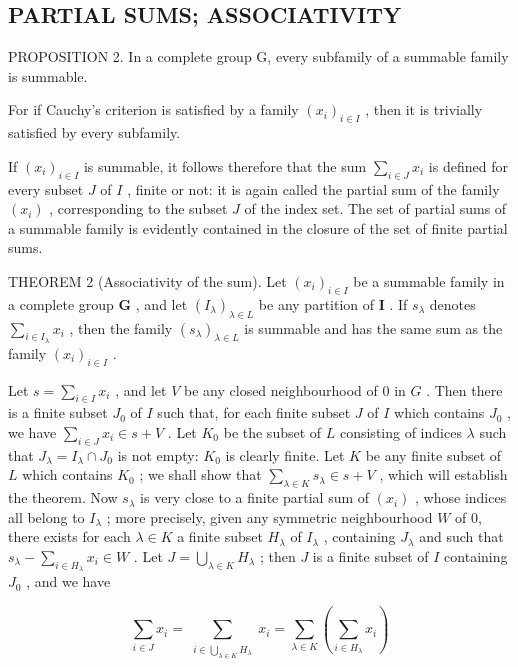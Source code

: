 \subsection{PARTIAL SUMS; ASSOCIATIVITY}

PROPOSITION 2. In a complete group G, every subfamily of a summable family is summable.

For if Cauchy's criterion is satisfied by a family \((x_{i})_{i\in I}\) , then it is trivially satisfied by every subfamily.

If \((x_{i})_{i\in I}\) is summable, it follows therefore that the sum \(\sum_{i\in J}x_{i}\) is defined for every subset \(J\) of \(I\) , finite or not: it is again called the partial sum of the family \((x_{i})\) , corresponding to the subset \(J\) of the index set. The set of partial sums of a summable family is evidently contained in the closure of the set of finite partial sums.

THEOREM 2 (Associativity of the sum). Let \((x_{i})_{i\in I}\) be a summable family in a complete group \(\mathbf{G}\) , and let \((I_{\lambda})_{\lambda \in L}\) be any partition of \(\mathbf{I}\) . If \(s_{\lambda}\) denotes \(\sum_{i\in I_{\lambda}}x_{i}\) , then the family \((s_{\lambda})_{\lambda \in L}\) is summable and has the same sum as the family \((x_{i})_{i\in I}\) .

Let \(s = \sum_{i \in I} x_i\) , and let \(V\) be any closed neighbourhood of 0 in \(G\) . Then there is a finite subset \(J_0\) of \(I\) such that, for each finite subset \(J\) of \(I\) which contains \(J_0\) , we have \(\sum_{i \in J} x_i \in s + V\) . Let \(K_0\) be the subset of \(L\) consisting of indices \(\lambda\) such that \(J_\lambda = I_\lambda \cap J_0\) is not empty: \(K_0\) is clearly finite. Let \(K\) be any finite subset of \(L\) which contains \(K_0\) ; we shall show that \(\sum_{\lambda \in K} s_\lambda \in s + V\) , which will establish the theorem. Now \(s_\lambda\) is very close to a finite partial sum of \((x_i)\) , whose indices all belong to \(I_\lambda\) ; more precisely, given any symmetric neighbourhood \(W\) of 0, there exists for each \(\lambda \in K\) a finite subset \(H_\lambda\) of \(I_\lambda\) , containing \(J_\lambda\) and such that \(s_\lambda - \sum_{i \in H_\lambda} x_i \in W\) . Let \(J = \bigcup_{\lambda \in K} H_\lambda\) ; then \(J\) is a finite subset of \(I\) containing \(J_0\) , and we have

\[
\sum_ {i \in J} x _ {i} = \sum_ {\substack {i \in \bigcup_ {\lambda \in K} H _ {\lambda}}} x _ {i} = \sum_ {\lambda \in K} (\sum_ {i \in H _ {\lambda}} x _ {i})
\]

